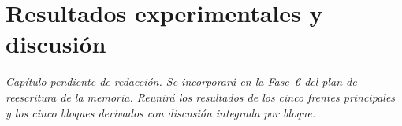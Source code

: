 
\chapter{Resultados experimentales y discusión}
\label{cap:resultados}

\textit{Capítulo pendiente de redacción. Se incorporará en la Fase~6 del
plan de reescritura de la memoria. Reunirá los resultados de los cinco
frentes principales y los cinco bloques derivados con discusión
integrada por bloque.}
